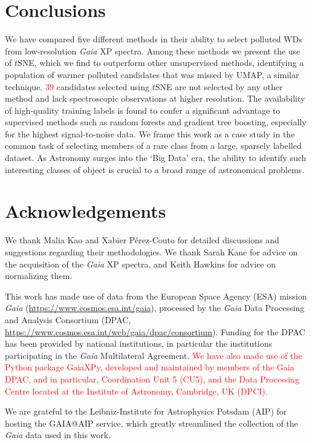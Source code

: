 \documentclass[fleqn,usenatbib]{rasti}
\newcommand{\red}[1]{\textcolor{red}{#1}}
\begin{document}
\section{Conclusions} \label{sec:conclusion}

We have compared five different methods in their ability to select polluted WDs from low-resolution \textit{Gaia} XP spectra.
Among these methods we present the use of $t$SNE, which we find to outperform other unsupervised methods, identifying a population of warmer polluted candidates that was missed by UMAP, a similar technique.
\red{39} candidates selected using $t$SNE are not selected by any other method and lack spectroscopic observations at higher resolution.
The availability of high-quality training labels is found to confer a significant advantage to supervised methods such as random forests and gradient tree boosting, especially for the highest signal-to-noise data.
We frame this work as a case study in the common task of selecting members of a rare class from a large, sparsely labelled dataset.
As Astronomy surges into the `Big Data' era, the ability to identify such interesting classes of object is crucial to a broad range of astronomical problems.




\section*{Acknowledgements}

We thank Malia Kao and Xabier P\'erez-Couto for detailed discussions and suggestions regarding their methodologies.
We thank Sarah Kane for advice on the acquisition of the \textit{Gaia} XP spectra, and Keith Hawkins for advice on normalizing them.

This work has made use of data from the European Space Agency (ESA) mission {\it Gaia} (\url{https://www.cosmos.esa.int/gaia}), processed by the {\it Gaia} Data Processing and Analysis Consortium (DPAC, \url{https://www.cosmos.esa.int/web/gaia/dpac/consortium}). Funding for the DPAC has been provided by national institutions, in particular the institutions participating in the {\it Gaia} Multilateral Agreement.
\red{
We have also made use of the Python package GaiaXPy, developed and maintained by members of the Gaia DPAC, and in particular, Coordination Unit 5 (CU5), and the Data Processing Centre located at the Institute of Astronomy, Cambridge, UK (DPCI).
}

We are grateful to the Leibniz-Institute for Astrophysics Potsdam (AIP) for hosting the GAIA@AIP service, which greatly streamlined the collection of the \textit{Gaia} data used in this work.
\end{document}
